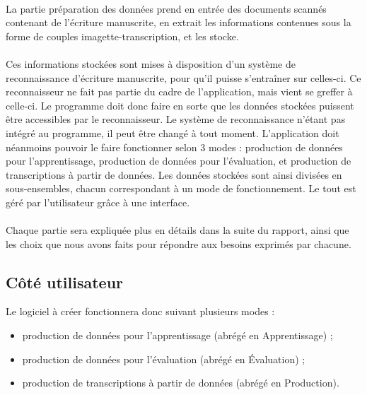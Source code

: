 \paragraph{}

La partie préparation des données prend en entrée des documents scannés contenant
de l’écriture manuscrite, en extrait les informations contenues sous la forme
de couples imagette-transcription, et les stocke.

\paragraph{}
Ces informations stockées sont mises à disposition d’un système de reconnaissance d'écriture manuscrite, pour qu’il
puisse s'entraîner sur celles-ci. Ce reconnaisseur ne fait pas partie du cadre de
l’application, mais vient se greffer à celle-ci. Le programme doit donc faire
en sorte que les données stockées puissent être accessibles par le reconnaisseur.
Le système de reconnaissance n’étant pas intégré au programme, il peut être changé à tout
moment. L’application doit néanmoins pouvoir le faire fonctionner selon 3 modes :
production de données pour l’apprentissage, production de données pour l’évaluation,
et production de transcriptions à partir de données. Les données stockées sont
ainsi divisées en sous-ensembles, chacun correspondant à un mode de
fonctionnement.
Le tout est géré par l’utilisateur grâce à une interface.

\paragraph{}
Chaque partie sera expliquée plus en détails dans la suite du rapport, ainsi que les choix
que nous avons faits pour répondre aux besoins exprimés par chacune.

\subsection{Côté utilisateur}

Le logiciel à créer fonctionnera donc suivant plusieurs modes :
\begin{itemize}
	\item production de données pour l’apprentissage (abrégé en Apprentissage) ;
	\item production de données pour l’évaluation (abrégé en Évaluation) ;
	\item production de transcriptions à partir de données (abrégé en Production).
\end{itemize}

